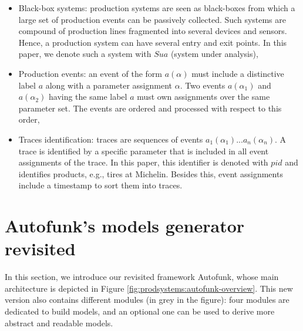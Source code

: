 \begin{itemize}
    \item Black-box systems: production systems are seen as
    black-boxes from which a large set of production events can
    be passively collected. Such systems are compound of
    production lines fragmented into several devices and sensors.
    Hence, a production system can have several entry and exit
    points. In this paper, we denote such a system with $\mathit{Sua}$
    (system under analysis),

    \item Production events: an event of the form $a(\alpha)$
    must include a distinctive label $a$ along with a parameter
    assignment $\alpha$. Two events $a(\alpha_1)$ and
    $a(\alpha_2)$ having the same label $a$ must own assignments
    over the same parameter set. The events are ordered and
    processed with respect to this order,

    \item Traces identification: traces are sequences of events
    $a_1(\alpha_1)$...$a_n(\alpha_n)$. A trace is identified by a
    specific parameter that is included in all event assignments
    of the trace. In this paper, this identifier is denoted with
    $pid$ and identifies products, e.g., tires at Michelin.
    Besides this, event assignments include a timestamp to sort
    them into traces.
\end{itemize}


\section{Autofunk's models generator revisited}
\label{sec:modelinf:prodsystems:autofunk}

In this section, we introduce our revisited framework Autofunk,
whose main architecture is depicted in Figure
\ref{fig:prodsystems:autofunk-overview}. This new version also
contains different modules (in grey in the figure): four modules
are dedicated to build models, and an optional one can be used to
derive more abstract and readable models.

